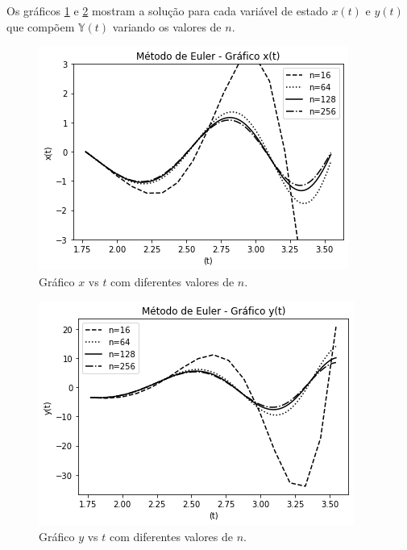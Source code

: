 \documentclass[amsmath,amssymb,floatfix]{revtex4}
\begin{document}
Os gráficos \ref{eulerx_difn} e \ref{eulery_difn} mostram a solução para cada variável de estado $x(t)$ e $y(t)$ que compõem $\mathbb{Y}(t)$ variando os valores de $n$.
\begin{figure}[H]
\centering
\includegraphics[scale=0.56]{eulerx_diferentesn}
\caption{Gráfico $x$ vs $t$ com diferentes valores de $n$.}
\label{eulerx_difn}
\end{figure}

\begin{figure}[H]
\centering
\includegraphics[scale=0.56]{eulery_diferentesn}
\caption{Gráfico $y$ vs $t$ com diferentes valores de $n$.}
\label{eulery_difn}
\end{figure}
\end{document}
